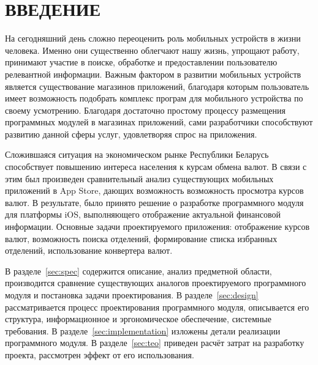 \section*{ВВЕДЕНИЕ}

На сегодняшний день сложно переоценить роль мобильных устройств в жизни человека.
Именно они существенно облегчают нашу жизнь, упрощают работу,
принимают участие в поиске, обработке и предоставлении
пользователю релевантной информации.
Важным фактором в развитии мобильных устройств является
существование магазинов приложений, благодаря которым пользователь имеет
возможность подобрать комплекс програм для мобильного устройства по своему усмотрению.
Благодаря достаточно простому процессу размещения программных модулей в магазинах
приложений, сами разработчики способствуют развитию данной сферы услуг,
удовлетворяя спрос на приложения.

Сложившаяся ситуация на экономическом рынке Республики Беларусь
способствует повышению интереса населения к курсам обмена валют.
В связи с этим был произведен сравнительный анализ существующих мобильных
приложений в App Store, дающих возможность возможность просмотра курсов валют.
В результате, было принято решение о разработке программного
модуля для платформы iOS, выполняющего отображение актуальной финансовой
информации. Основные задачи проектируемого приложения: отображение курсов валют,
возможность поиска отделений, формирование списка избранных отделений,
использование конвертера валют.

В разделе~\ref{sec:spec} содержится описание, анализ предметной области,
производится сравнение существующих аналогов проектируемого программного модуля
и постановка задачи проектирования.
В разделе~\ref{sec:design} рассматривается процесс проектирования программного модуля,
описывается его структура, информационное и эргономическое обеспечение,
системные требования.
В разделе~\ref{sec:implementation} изложены детали реализации программного модуля.
В разделе~\ref{sec:teo} приведен расчёт затрат на разработку проекта,
рассмотрен эффект от его использования.
